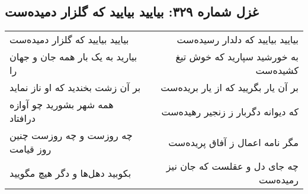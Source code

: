 \begin{center}
\section*{غزل شماره ۳۲۹: بیایید بیایید که گلزار دمیده‌ست}
\label{sec:0329}
\begin{longtable}{l p{0.5cm} r}
بیایید بیایید که گلزار دمیده‌ست
&&
بیایید بیایید که دلدار رسیده‌ست
\\
بیارید به یک بار همه جان و جهان را
&&
به خورشید سپارید که خوش تیغ کشیده‌ست
\\
بر آن زشت بخندید که او ناز نماید
&&
بر آن یار بگریید که از یار بریده‌ست
\\
همه شهر بشورید چو آوازه درافتاد
&&
که دیوانه دگربار ز زنجیر رهیده‌ست
\\
چه روزست و چه روزست چنین روز قیامت
&&
مگر نامه اعمال ز آفاق پریده‌ست
\\
بکوبید دهل‌ها و دگر هیچ مگویید
&&
چه جای دل و عقلست که جان نیز رمیده‌ست
\\
\end{longtable}
\end{center}
